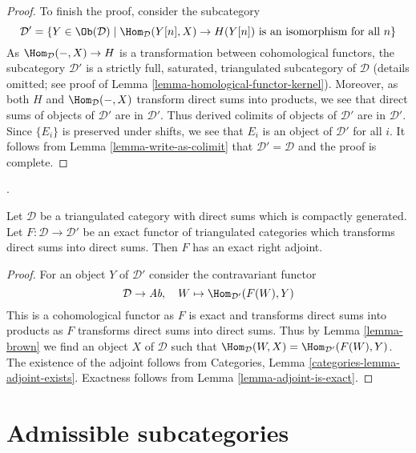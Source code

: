 \begin{proof}
\medskip\noindent
To finish the proof, consider the subcategory
$$
\mathcal{D}' =
\{Y \in \Ob(\mathcal{D}) \mid \Hom_\mathcal{D}(Y[n], X) \to H(Y[n])
\text{ is an isomorphism for all }n\}
$$
As $\Hom_\mathcal{D}(-, X) \to H$ is a transformation between
cohomological functors,
the subcategory $\mathcal{D}'$ is a strictly full, saturated, triangulated
subcategory of $\mathcal{D}$ (details omitted; see proof of
Lemma \ref{lemma-homological-functor-kernel}). Moreover, as both
$H$ and $\Hom_\mathcal{D}(-, X)$ transform direct sums into products,
we see that direct sums of objects of $\mathcal{D}'$ are in $\mathcal{D}'$.
Thus derived colimits of objects of $\mathcal{D}'$ are in $\mathcal{D}'$.
Since $\{E_i\}$ is preserved under shifts, we see that $E_i$
is an object of $\mathcal{D}'$ for all $i$. It follows from
Lemma \ref{lemma-write-as-colimit} that $\mathcal{D}' = \mathcal{D}$
and the proof is complete.
\end{proof}

\begin{proposition}
\label{proposition-brown}
\begin{reference}
\cite[Theorem 4.1]{Neeman-Grothendieck}.
\end{reference}
Let $\mathcal{D}$ be a triangulated category with direct sums which is
compactly generated. Let $F : \mathcal{D} \to \mathcal{D}'$ be an
exact functor of triangulated categories which transforms direct sums
into direct sums. Then $F$ has an exact right adjoint.
\end{proposition}

\begin{proof}
For an object $Y$ of $\mathcal{D}'$ consider the contravariant functor
$$
\mathcal{D} \to \textit{Ab},\quad W \mapsto \Hom_{\mathcal{D}'}(F(W), Y)
$$
This is a cohomological functor as $F$ is exact and transforms direct sums
into products as $F$ transforms direct sums into direct sums. Thus by
Lemma \ref{lemma-brown} we find an object $X$ of $\mathcal{D}$ such that
$\Hom_\mathcal{D}(W, X) = \Hom_{\mathcal{D}'}(F(W), Y)$.
The existence of the adjoint follows from
Categories, Lemma \ref{categories-lemma-adjoint-exists}.
Exactness follows from Lemma \ref{lemma-adjoint-is-exact}.
\end{proof}







\section{Admissible subcategories}
\label{section-admissible}

